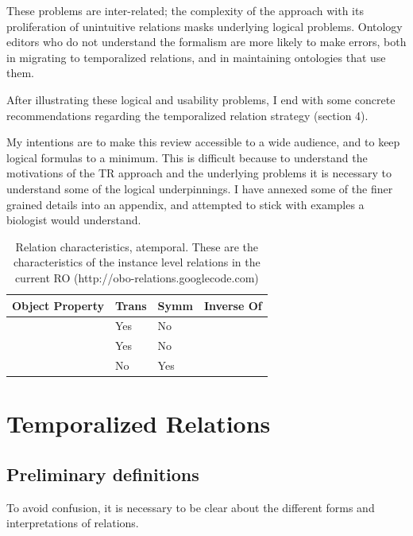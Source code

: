 \documentclass{bioinfo}
\def\partOf{\pr{part\_of}}
\def\hasPart{\pr{has\_part}}
\def\adjacentTo{\pr{adjacent\_to}}
\begin{document}
These problems are inter-related; the complexity of the approach with
its proliferation of unintuitive relations masks underlying logical
problems. Ontology editors who do not understand the formalism are
more likely to make errors, both in migrating to temporalized
relations, and in maintaining ontologies that use them.

After illustrating these logical and usability problems, I end with
some concrete recommendations regarding the temporalized relation
strategy (section 4).

My intentions are to make this review accessible to a wide audience,
and to keep logical formulas to a minimum. This is difficult because
to understand the motivations of the TR approach and the underlying
problems it is necessary to understand some of the logical
underpinnings. I have annexed some of the finer grained details into
an appendix, and attempted to stick with examples a biologist would
understand.

\begin{table}
\begin{tabular}{ | p{2.5cm} | p{1cm} | p{1cm} | p{2cm} | }
\hline
\textbf{Object Property} & \textbf{Trans} & \textbf{Symm} & \textbf{Inverse Of}  \\
\hline
\partOf\  & Yes & No & \hasPart  \\
\hline
\hasPart\ & Yes & No & \partOf \\
\hline
\adjacentTo\ & No & Yes &  \\
\hline
\end{tabular}
\caption{Relation characteristics, atemporal. These are the characteristics of the instance level relations in the current RO (http://obo-relations.googlecode.com)}
\label{tab:characteristics-atemporal}
\end{table}

\section{Temporalized Relations}

\subsection{Preliminary definitions}

To avoid confusion, it is necessary to be clear about the different
forms and interpretations of relations.
\end{document}
